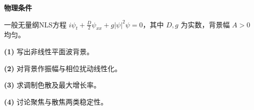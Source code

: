 \textbf{物理条件}\par 一般无量纲NLS方程 \(i\psi_t+\tfrac D2\psi_{xx}+g|\psi|^2\psi=0\)，其中 \(D,g\) 为实数，背景幅 \(A>0\) 均匀。
\par\noindent\textbf{(1)} 写出非线性平面波背景。
\par\noindent\textbf{(2)} 对背景作振幅与相位扰动线性化。
\par\noindent\textbf{(3)} 求调制色散及最大增长率。
\par\noindent\textbf{(4)} 讨论聚焦与散焦两类稳定性。
